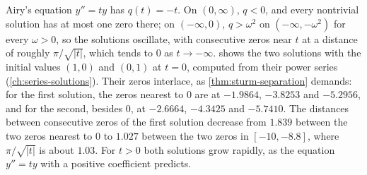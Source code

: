 Airy's equation $y''=ty$ has $q(t)=-t$. On $(0,\infty)$, $q<0$, and every nontrivial solution has at most one zero there; on $(-\infty,0)$, $q>\omega^2$ on $(-\infty,-\omega^2)$ for every $\omega>0$, so the solutions oscillate, with consecutive zeros near $t$ at a distance of roughly $\pi/\sqrt{|t|}$, which tends to $0$ as $t\to-\infty$.  shows the two solutions with the initial values $(1,0)$ and $(0,1)$ at $t=0$, computed from their power series (\cref{ch:series-solutions}). Their zeros interlace, as \cref{thm:sturm-separation} demands: for the first solution, the zeros nearest to $0$ are at $-1.9864$, $-3.8253$ and $-5.2956$, and for the second, besides $0$, at $-2.6664$, $-4.3425$ and $-5.7410$. The distances between consecutive zeros of the first solution decrease from $1.839$ between the two zeros nearest to $0$ to $1.027$ between the two zeros in $[-10,-8.8]$, where $\pi/\sqrt{|t|}$ is about $1.03$. For $t>0$ both solutions grow rapidly, as the equation $y''=ty$ with a positive coefficient predicts.

